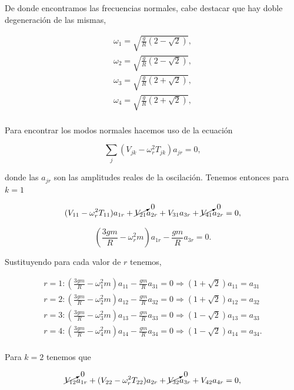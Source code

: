 \documentclass[a4paper,10pt]{article}
\numberwithin{equation}{section}
\begin{document}
De donde encontramos las frecuencias normales, cabe destacar que hay doble degeneración 
de las mismas,

\begin{align}
 \omega_1 = \sqrt{\frac{g}{R}(2 - \sqrt{2})}, \\
 \omega_2 = \sqrt{\frac{g}{R}(2 - \sqrt{2})}, \\
 \omega_3 = \sqrt{\frac{g}{R}(2 + \sqrt{2})}, \\
 \omega_4 = \sqrt{\frac{g}{R}(2 + \sqrt{2})}, \\ 
\end{align}

Para encontrar los modos normales hacemos uso de la ecuación

\begin{equation}
 \sum_j (V_{jk} - \omega^2_r T_{jk})a_{jr} = 0,
\end{equation}

donde las $a_{jr}$ son las amplitudes reales de la oscilación. Tenemos entonces 
para $k = 1$ 

\begin{equation}
 (V_{11} - \omega_r^2 T_{11})a_{1r} + \cancelto{0}{V_{21}}a_{2r} + V_{31}a_{3r} + \cancelto{0}{V_{41}}a_{2r} = 0,
\end{equation}

\begin{equation}
 \left(\frac{3gm}{R} - \omega_r^2m\right)a_{1r} - \frac{gm}{R} a_{3r} = 0. 
\end{equation}

Sustituyendo para cada valor de $r$ tenemos,

\begin{align}
 r = 1:  \left(\frac{3gm}{R} -  \omega_1^2m\right)a_{11} - \frac{gm}{R} a_{31} = 0 \Rightarrow
 (1+ \sqrt{2})a_{11} = a_{31} \\
 r = 2:  \left(\frac{3gm}{R} - \omega_2^2m\right)a_{12} - \frac{gm}{R} a_{32} = 0 \Rightarrow
 (1+ \sqrt{2})a_{12} = a_{32} \\
 r = 3:  \left(\frac{3gm}{R} - \omega_3^2m\right)a_{13} - \frac{gm}{R} a_{33} = 0 \Rightarrow
 (1 - \sqrt{2})a_{13} = a_{33} \\
 r = 4:  \left(\frac{3gm}{R} - \omega_4^2m\right)a_{14} - \frac{gm}{R} a_{34} = 0 \Rightarrow
 (1 - \sqrt{2})a_{14} = a_{34}. \\
\end{align}

Para $k=2$ tenemos que 

\begin{equation}
 \cancelto{0}{V_{12}}a_{1r} + (V_{22} - \omega_r^2T_{22})a_{2r} + \cancelto{0}{V_{32}}a_{3r} + V_{42}a_{4r} = 0,
\end{equation}
\end{document}
